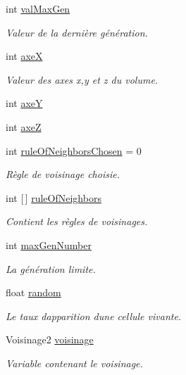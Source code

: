 \begin{DoxyCompactItemize}
int \mbox{\hyperlink{class_parameters_a169d89f0e1954fe0dd8a588db68bc5d3}{val\+Max\+Gen}}
\begin{DoxyCompactList}\small\item\em Valeur de la dernière génération. \end{DoxyCompactList}\item 
int \mbox{\hyperlink{class_parameters_ad1ebedc3a59e983f8bb3f4816cbe0969}{axeX}}
\begin{DoxyCompactList}\small\item\em Valeur des axes x,y et z du volume. \end{DoxyCompactList}\item 
int \mbox{\hyperlink{class_parameters_a30e0f9fdc5cff2253f40ab0206f1b748}{axeY}}
\item 
int \mbox{\hyperlink{class_parameters_a0259b6b9e73302fb43a80b6756422596}{axeZ}}
\item 
int \mbox{\hyperlink{class_parameters_ae93c8919d298fca6d55246e5f2d68f64}{rule\+Of\+Neighbors\+Chosen}} = 0
\begin{DoxyCompactList}\small\item\em Règle de voisinage choisie. \end{DoxyCompactList}\item 
int \mbox{[}$\,$\mbox{]} \mbox{\hyperlink{class_parameters_a9900b1e54888301a55408bf4308a6017}{rule\+Of\+Neighbors}}
\begin{DoxyCompactList}\small\item\em Contient les règles de voisinages. \end{DoxyCompactList}\item 
int \mbox{\hyperlink{class_parameters_ab2aae264b2829322043e1b23394bc996}{max\+Gen\+Number}}
\begin{DoxyCompactList}\small\item\em La génération limite. \end{DoxyCompactList}\item 
float \mbox{\hyperlink{class_parameters_a35b50b196bd5e9bfde42d8cc69642bfb}{random}}
\begin{DoxyCompactList}\small\item\em Le taux d\textquotesingle{}apparition d\textquotesingle{}une cellule vivante. \end{DoxyCompactList}\item 
Voisinage2 \mbox{\hyperlink{class_parameters_ad6693ced27cf9d3ebe6d35400ee1bdd5}{voisinage}}
\begin{DoxyCompactList}\small\item\em Variable contenant le voisinage. \end{DoxyCompactList}\item 

\end{DoxyCompactItemize}
